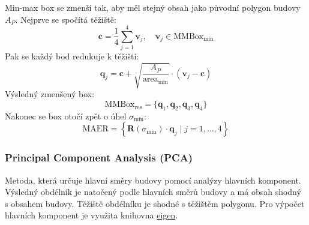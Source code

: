 Min-max box se zmenší tak, aby měl stejný obsah jako původní polygon budovy\( A_P \). Nejprve se spočítá těžiště:
\[
\mathbf{c} = \frac{1}{4} \sum_{j=1}^4 \mathbf{v}_j, \quad \mathbf{v}_j \in \text{MMBox}_{\min}
\]
Pak se každý bod redukuje k těžišti:
\begin{equation}
    \mathbf{q}_j = \mathbf{c} + \sqrt{\frac{A_P}{\text{area}_{\min}}} \cdot (\mathbf{v}_j - \mathbf{c})
\end{equation}
Výsledný zmenšený box:
\[
\text{MMBox}_{\text{res}} = \{ \mathbf{q}_1, \mathbf{q}_2, \mathbf{q}_3, \mathbf{q}_4 \}
\]
Nakonec se box otočí zpět o úhel \( \sigma_{\min} \):
\begin{equation}
    \text{MAER} = \left\{ \mathbf{R}(\sigma_{\min}) \cdot \mathbf{q}_j \mid j = 1,\dots,4 \right\}
\end{equation}



\subsubsection{Principal Component Analysis (PCA)}
Metoda, která určuje hlavní směry budovy pomocí analýzy hlavních komponent. Výsledný obdélník je natočený podle hlavních směrů budovy a má obsah shodný s obsahem budovy. Těžiště obdélníku je shodné s těžištěm polygonu. Pro výpočet hlavních komponent je využita knihovna \href{https://gitlab.com/libeigen/eigen}{eigen}\cite{eigen}.\\

